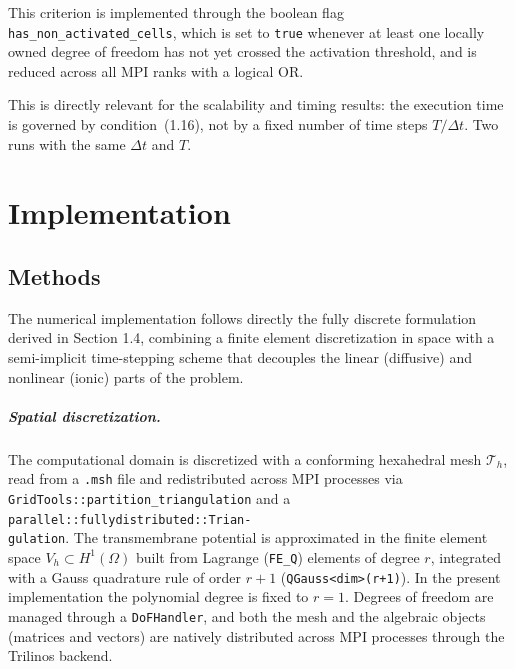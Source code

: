 \documentclass{Configuration_Files/PoliMi3i_thesis}
\begin{document}
This criterion is implemented through the boolean flag
\texttt{has\_non\_activated\_cells}, which is set to \texttt{true} whenever
at least one locally owned degree of freedom has not yet crossed the
activation threshold, and is reduced across all MPI ranks with a logical OR.

This is directly relevant for the scalability and timing results: the execution time is governed by
condition~(1.16), not by a fixed number of time steps $T/\Delta t$. Two runs with the same $\Delta t$ and $T$.













\newpage
\chapter{Implementation}
\section{Methods}
The numerical implementation follows directly the fully discrete formulation derived in Section 1.4, combining a finite element discretization in space with a semi-implicit time-stepping
scheme that decouples the linear (diffusive) and nonlinear (ionic) parts of the problem.

\paragraph{Spatial discretization.}
The computational domain is discretized with a conforming hexahedral mesh
$\mathcal{T}_h$, read from a \texttt{.msh} file and redistributed across MPI processes via
\texttt{GridTools::partition\_triangulation} and a
\texttt{parallel::fullydistributed::Trian-\\gulation}. The transmembrane potential is
approximated in the finite element space $V_h \subset H^1(\Omega)$ built from Lagrange
(\texttt{FE\_Q}) elements of degree $r$, integrated with a Gauss quadrature rule of order
$r+1$ (\texttt{QGauss<dim>(r+1)}). In the present implementation the polynomial degree is
fixed to $r=1$. Degrees of freedom are managed through a \texttt{DoFHandler}, and
both the mesh and the algebraic objects (matrices and vectors) are natively distributed
across MPI processes through the Trilinos backend.
\end{document}
